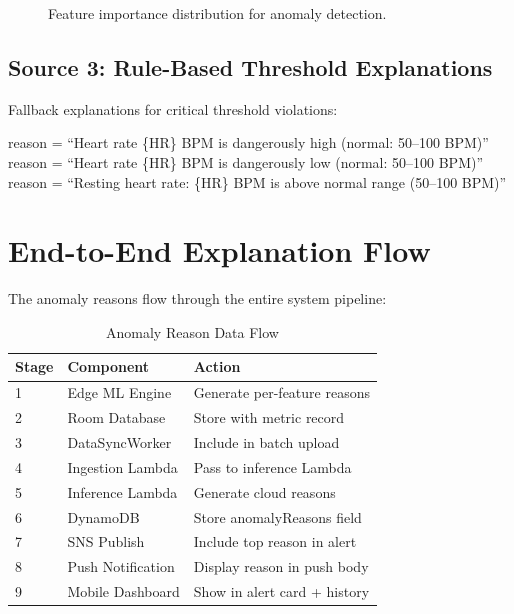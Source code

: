 \documentclass[conference]{IEEEtran}
\begin{document}
\begin{figure}[H]
\centering
{}
\caption{Feature importance distribution for anomaly detection.}
\label{fig:feat_imp}
\end{figure}

\subsection{Source 3: Rule-Based Threshold Explanations}
Fallback explanations for critical threshold violations:

\begin{algorithmic}
    \STATE reason = ``Heart rate \{HR\} BPM is dangerously high (normal: 50--100 BPM)''
    \STATE reason = ``Heart rate \{HR\} BPM is dangerously low (normal: 50--100 BPM)''
    \STATE reason = ``Resting heart rate: \{HR\} BPM is above normal range (50--100 BPM)''
\ENDIF
\end{algorithmic}

\section{End-to-End Explanation Flow}

The anomaly reasons flow through the entire system pipeline:

\begin{table}[H]
\centering
\caption{Anomaly Reason Data Flow}
\label{tab:reason_flow}
\begin{tabular}{llp{3cm}}
\toprule
\textbf{Stage} & \textbf{Component} & \textbf{Action} \\
\midrule
1 & Edge ML Engine & Generate per-feature reasons \\
2 & Room Database & Store with metric record \\
3 & DataSyncWorker & Include in batch upload \\
4 & Ingestion Lambda & Pass to inference Lambda \\
5 & Inference Lambda & Generate cloud reasons \\
6 & DynamoDB & Store anomalyReasons field \\
7 & SNS Publish & Include top reason in alert \\
8 & Push Notification & Display reason in push body \\
9 & Mobile Dashboard & Show in alert card + history \\
\bottomrule
\end{tabular}
\end{table}
\end{document}

